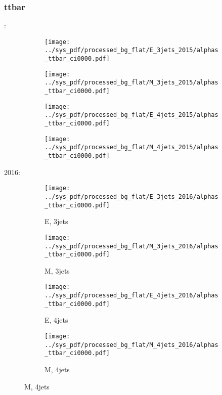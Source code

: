 \documentclass{beamer}
\begin{document}
\begin{frame}
\frametitle{ttbar}
\fontsize{5}{1}:
\begin{figure}
\centering
\begin{subfigure}[b]{0.24\textwidth}
\texttt{[image: ../sys\_pdf/processed\_bg\_flat/E\_3jets\_2015/alphas\_ttbar\_ci0000.pdf]}
\end{subfigure}
\begin{subfigure}[b]{0.24\textwidth}
\texttt{[image: ../sys\_pdf/processed\_bg\_flat/M\_3jets\_2015/alphas\_ttbar\_ci0000.pdf]}
\end{subfigure}
\begin{subfigure}[b]{0.24\textwidth}
\texttt{[image: ../sys\_pdf/processed\_bg\_flat/E\_4jets\_2015/alphas\_ttbar\_ci0000.pdf]}
\end{subfigure}
\begin{subfigure}[b]{0.24\textwidth}
\texttt{[image: ../sys\_pdf/processed\_bg\_flat/M\_4jets\_2015/alphas\_ttbar\_ci0000.pdf]}
\end{subfigure}
\end{figure}
2016:
\begin{figure}
\centering
\begin{subfigure}[b]{0.24\textwidth}
\texttt{[image: ../sys\_pdf/processed\_bg\_flat/E\_3jets\_2016/alphas\_ttbar\_ci0000.pdf]}
\captionsetup{font=tiny}
\caption{E, 3jets}
\end{subfigure}
\begin{subfigure}[b]{0.24\textwidth}
\texttt{[image: ../sys\_pdf/processed\_bg\_flat/M\_3jets\_2016/alphas\_ttbar\_ci0000.pdf]}
\captionsetup{font=tiny}
\caption{M, 3jets}
\end{subfigure}
\begin{subfigure}[b]{0.24\textwidth}
\texttt{[image: ../sys\_pdf/processed\_bg\_flat/E\_4jets\_2016/alphas\_ttbar\_ci0000.pdf]}
\captionsetup{font=tiny}
\caption{E, 4jets}
\end{subfigure}
\begin{subfigure}[b]{0.24\textwidth}
\texttt{[image: ../sys\_pdf/processed\_bg\_flat/M\_4jets\_2016/alphas\_ttbar\_ci0000.pdf]}
\captionsetup{font=tiny}
\caption{M, 4jets}
\end{subfigure}
\end{figure}
\end{frame}
\end{document}
